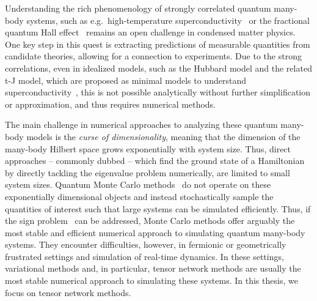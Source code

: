 Understanding the rich phenomenology of strongly correlated quantum many-body systems, such as e.g.~high-temperature superconductivity~\cite{bednorz1986, anderson1987} or the fractional quantum Hall effect~\cite{tsui1982, stormer1999, leonard2023} remains an open challenge in condensed matter physics.
%
One key step in this quest is extracting predictions of measurable quantities from candidate theories, allowing for a connection to experiments.
%
Due to the strong correlations, even in idealized models, such as the Hubbard model \cite{hubbard1963electron} and the related t-J model, which are proposed as minimal models to understand superconductivity~\cite{zhang1988, dagotto1994, simonscollab2020}, this is not possible analytically without further simplification or approximation, and thus requires numerical methods.



The main challenge in numerical approaches to analyzing these quantum many-body models is the \emph{curse of dimensionality}, meaning that the dimension of the many-body Hilbert space grows exponentially with system size.
%
Thus, direct approaches -- commonly dubbed  -- which find the ground state of a Hamiltonian by directly tackling the eigenvalue problem numerically, are limited to small system sizes.
%
Quantum Monte Carlo methods~\cite{becca2017} do not operate on these exponentially dimensional objects and instead stochastically sample the quantities of interest such that large systems can be simulated efficiently.
%
Thus, if the sign problem~\cite{troyer2005} can be addressed, Monte Carlo methods offer arguably the most stable and efficient numerical approach to simulating quantum many-body systems.
%
They encounter difficulties, however, in fermionic or geometrically frustrated settings and simulation of real-time dynamics.
%
In these settings, variational methods and, in particular, tensor network methods are usually the most stable numerical approach to simulating these systems.
%
In this thesis, we focus on tensor network methods.




